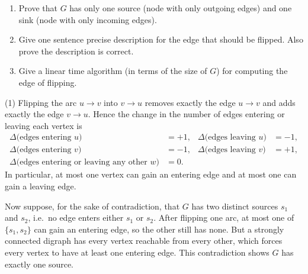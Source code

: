 \documentclass[letterpaper, 11pt]{article}
\newcommand{\1}{\mathds{1}}	%
\theoremstyle{definition}
\newenvironment{solution}{{\par\noindent\it Solution.}}{}
\begin{document}
\begin{enumerate}
    \item Prove that $G$ has only one source (node with only outgoing edges) and one sink (node with only incoming edges).
    \item Give one sentence precise description for the edge that should be flipped. Also prove the description is correct.
    \item Give a linear time algorithm (in terms of the size of $G$) for computing the edge of flipping.
\end{enumerate}
\begin{solution}
(1)
Flipping the arc \(u\to v\) into \(v\to u\) removes exactly the edge \(u\to v\) and adds exactly the edge \(v\to u\).  Hence the change in the number of edges entering or leaving each vertex is
\begin{align*}
\Delta\bigl(\text{edges entering }u\bigr)&=+1, 
&\Delta\bigl(\text{edges leaving }u\bigr)&=-1,\\
\Delta\bigl(\text{edges entering }v\bigr)&=-1, 
&\Delta\bigl(\text{edges leaving }v\bigr)&=+1,\\
\Delta\bigl(\text{edges entering or leaving any other }w\bigr)&=0.
\end{align*}
In particular, at most one vertex can gain an entering edge and at most one can gain a leaving edge.

Now suppose, for the sake of contradiction, that \(G\) has two distinct sources \(s_1\) and \(s_2\), i.e.\ no edge enters either \(s_1\) or \(s_2\).  After flipping one arc, at most one of \(\{s_1,s_2\}\) can gain an entering edge, so the other still has none.  But a strongly connected digraph has every vertex reachable from every other, which forces every vertex to have at least one entering edge.  This contradiction shows \(G\) has exactly one source.


\end{solution}
\end{document}
